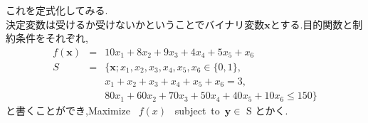 \documentclass[12pt]{jarticle}
\begin{document}
\begin{description}
\begin{table}[h]
\begin{center}
		      \end{center}
	      \end{table}
	      これを定式化してみる.\\
	      決定変数は受けるか受けないかということでバイナリ変数$\boldsymbol{x}$とする.目的関数と制約条件をそれぞれ,
	      \begin{eqnarray}
		      f(\boldsymbol{x})&=&10x_1+8x_2+9x_3+4x_4+5x_5+x_6\nonumber\\
		      S&=&\{\boldsymbol{x};x_1,x_2,x_3,x_4,x_5,x_6\in \{0,1\},\nonumber\\
		      &&x_1+x_2+x_3+x_4+x_5+x_6=3,\nonumber\\
		      &&80x_1+60x_2+70x_3+50x_4+40x_5+10x_6\leq 150\}\nonumber
	      \end{eqnarray}
	      と書くことができ,Maximize \ $f(x)$ \ subject\ to\ $\boldsymbol{y}\in$ S とかく.       
\end{description}
\end{document}
